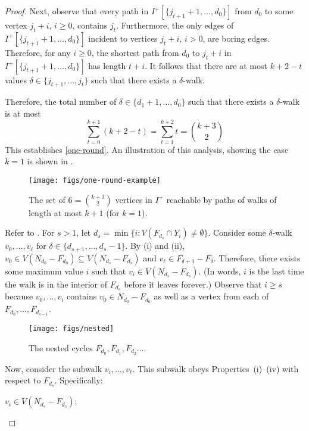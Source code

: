\documentclass{patmorin}
\begin{document}
\begin{proof}
  Next, observe that every path in $I^+[\{j_{t+1}+1,\ldots,d_0\}]$ from $d_0$ to some vertex  $j_{t}+i$, $i\ge 0$, contains $j_t$.  Furthermore, the only edges of $I^+[\{j_{t+1}+1,\ldots,d_0\}]$ incident to vertices $j_t+i$, $i>0$, are boring edges.  Therefore, for any $i\ge 0$, the shortest path from $d_0$ to $j_t+i$ in $I^+[\{j_{t+1}+1,\ldots,d_0\}]$ has length $t+i$.  It follows that there are at most $k+2-t$ values $\delta\in\{j_{t+1},\ldots,j_t\}$ such that there exists a $\delta$-walk.
  
  Therefore, the total number of $\delta\in\{d_1+1,\ldots,d_0\}$ such that there exists a $\delta$-walk is at most
  \[
     \sum_{t=0}^{k+1} (k+2-t) = \sum_{t=1}^{k+2} t = \binom{k+3}{2}
  \]
  This establishes \eqref{one-round}.  An illustration of this analysis, showing the case $k=1$ is shown in .
  \begin{figure}
    \begin{center}
      \texttt{[image: figs/one-round-example]}
    \end{center}
    \caption{The set of $6=\binom{k+3}{2}$ vertices in $I^+$ reachable by paths of walks of length at most $k+1$ (for $k=1$).}
  \end{figure}
  
  
  Refer to . For $s>1$, let $d_s=\min\{i: V(F_{d_s}\cap Y_i)\neq\emptyset \}$. Consider some $\delta$-walk $v_0,\ldots,v_\ell$ for $\delta\in \{ d_{s+1},\ldots,d_{s}-1\}$.  By (i) and (ii), $v_0\in V(N_{d_0}-F_{d_0})\subseteq V(N_{d_s}-F_{d_s})$ and $v_\ell\in F_{\delta+1}-F_\delta$.  Therefore, there exists some maximum value $i$ such that $v_i\in V(N_{d_{s}}-F_{d_{s}})$.  (In words, $i$ is the last time the walk is in the interior of $F_{d_s}$ before it leaves forever.)
  Observe that $i\ge s$ because $v_0,\ldots,v_i$ contains $v_0\in N_{d_0}-F_{d_0}$ as well as a vertex from each of $F_{d_0},\ldots,F_{d_{s-1}}$.  

  \begin{figure}
    \begin{center}
      \texttt{[image: figs/nested]}
    \end{center}
    \caption{The nested cycles $F_{d_0}, F_{d_1},F_{d_2}\ldots$.}
  \end{figure}
  
  Now, consider the subwalk $v_i,\ldots,v_\ell$.  This subwalk obeys Properties~(i)--(iv) with respect to $F_{d_s}$.  Specifically:
  \begin{compactenum}[(i)]
    \item $v_i\in V(N_{d_s}-F_{d_s})$;
    

\end{compactenum}
\end{proof}
\end{document}
